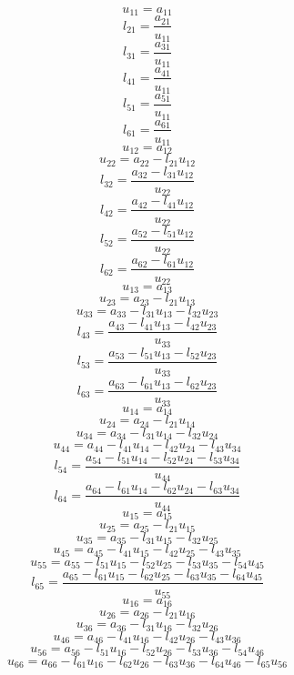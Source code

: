 \documentclass[10pt,a4paper,dvipdfmx]{article}
\begin{document}
\begin{multicols}{2}
\vfill\null
\columnbreak
$$ u_{{1}{1}} = a_{{1}{1}} $$
$$ l_{{2}{1}} = \dfrac{a_{{2}{1}}}{u_{{1}{1}}} $$
$$ l_{{3}{1}} = \dfrac{a_{{3}{1}}}{u_{{1}{1}}} $$
$$ l_{{4}{1}} = \dfrac{a_{{4}{1}}}{u_{{1}{1}}} $$
$$ l_{{5}{1}} = \dfrac{a_{{5}{1}}}{u_{{1}{1}}} $$
$$ l_{{6}{1}} = \dfrac{a_{{6}{1}}}{u_{{1}{1}}} $$
$$ u_{{1}{2}} = a_{{1}{2}} $$
$$ u_{{2}{2}} = a_{{2}{2}}- l_{{2}{1}} u_{{1}{2}} $$
$$ l_{{3}{2}} = \dfrac{a_{{3}{2}}- l_{{3}{1}} u_{{1}{2}}}{u_{{2}{2}}} $$
$$ l_{{4}{2}} = \dfrac{a_{{4}{2}}- l_{{4}{1}} u_{{1}{2}}}{u_{{2}{2}}} $$
$$ l_{{5}{2}} = \dfrac{a_{{5}{2}}- l_{{5}{1}} u_{{1}{2}}}{u_{{2}{2}}} $$
$$ l_{{6}{2}} = \dfrac{a_{{6}{2}}- l_{{6}{1}} u_{{1}{2}}}{u_{{2}{2}}} $$
$$ u_{{1}{3}} = a_{{1}{3}} $$
$$ u_{{2}{3}} = a_{{2}{3}}- l_{{2}{1}} u_{{1}{3}} $$
$$ u_{{3}{3}} = a_{{3}{3}}- l_{{3}{1}} u_{{1}{3}}- l_{{3}{2}} u_{{2}{3}} $$
$$ l_{{4}{3}} = \dfrac{a_{{4}{3}}- l_{{4}{1}} u_{{1}{3}}- l_{{4}{2}} u_{{2}{3}}}{u_{{3}{3}}} $$
$$ l_{{5}{3}} = \dfrac{a_{{5}{3}}- l_{{5}{1}} u_{{1}{3}}- l_{{5}{2}} u_{{2}{3}}}{u_{{3}{3}}} $$
$$ l_{{6}{3}} = \dfrac{a_{{6}{3}}- l_{{6}{1}} u_{{1}{3}}- l_{{6}{2}} u_{{2}{3}}}{u_{{3}{3}}} $$
$$ u_{{1}{4}} = a_{{1}{4}} $$
$$ u_{{2}{4}} = a_{{2}{4}}- l_{{2}{1}} u_{{1}{4}} $$
$$ u_{{3}{4}} = a_{{3}{4}}- l_{{3}{1}} u_{{1}{4}}- l_{{3}{2}} u_{{2}{4}} $$
$$ u_{{4}{4}} = a_{{4}{4}}- l_{{4}{1}} u_{{1}{4}}- l_{{4}{2}} u_{{2}{4}}- l_{{4}{3}} u_{{3}{4}} $$
$$ l_{{5}{4}} = \dfrac{a_{{5}{4}}- l_{{5}{1}} u_{{1}{4}}- l_{{5}{2}} u_{{2}{4}}- l_{{5}{3}} u_{{3}{4}}}{u_{{4}{4}}} $$
$$ l_{{6}{4}} = \dfrac{a_{{6}{4}}- l_{{6}{1}} u_{{1}{4}}- l_{{6}{2}} u_{{2}{4}}- l_{{6}{3}} u_{{3}{4}}}{u_{{4}{4}}} $$
$$ u_{{1}{5}} = a_{{1}{5}} $$
$$ u_{{2}{5}} = a_{{2}{5}}- l_{{2}{1}} u_{{1}{5}} $$
$$ u_{{3}{5}} = a_{{3}{5}}- l_{{3}{1}} u_{{1}{5}}- l_{{3}{2}} u_{{2}{5}} $$
$$ u_{{4}{5}} = a_{{4}{5}}- l_{{4}{1}} u_{{1}{5}}- l_{{4}{2}} u_{{2}{5}}- l_{{4}{3}} u_{{3}{5}} $$
$$ u_{{5}{5}} = a_{{5}{5}}- l_{{5}{1}} u_{{1}{5}}- l_{{5}{2}} u_{{2}{5}}- l_{{5}{3}} u_{{3}{5}}- l_{{5}{4}} u_{{4}{5}} $$
$$ l_{{6}{5}} = \dfrac{a_{{6}{5}}- l_{{6}{1}} u_{{1}{5}}- l_{{6}{2}} u_{{2}{5}}- l_{{6}{3}} u_{{3}{5}}- l_{{6}{4}} u_{{4}{5}}}{u_{{5}{5}}} $$
$$ u_{{1}{6}} = a_{{1}{6}} $$
$$ u_{{2}{6}} = a_{{2}{6}}- l_{{2}{1}} u_{{1}{6}} $$
$$ u_{{3}{6}} = a_{{3}{6}}- l_{{3}{1}} u_{{1}{6}}- l_{{3}{2}} u_{{2}{6}} $$
$$ u_{{4}{6}} = a_{{4}{6}}- l_{{4}{1}} u_{{1}{6}}- l_{{4}{2}} u_{{2}{6}}- l_{{4}{3}} u_{{3}{6}} $$
$$ u_{{5}{6}} = a_{{5}{6}}- l_{{5}{1}} u_{{1}{6}}- l_{{5}{2}} u_{{2}{6}}- l_{{5}{3}} u_{{3}{6}}- l_{{5}{4}} u_{{4}{6}} $$
$$ u_{{6}{6}} = a_{{6}{6}}- l_{{6}{1}} u_{{1}{6}}- l_{{6}{2}} u_{{2}{6}}- l_{{6}{3}} u_{{3}{6}}- l_{{6}{4}} u_{{4}{6}}- l_{{6}{5}} u_{{5}{6}} $$
\end{multicols}
\end{document}
